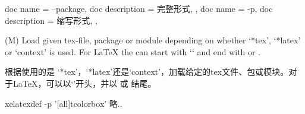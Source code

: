 \begin{docKeys}[
doc no index,   %
doc parameter = {~\meta{pkg}},
]
{
{
    doc name        = --package,
    doc description = 完整形式,
},
{
    doc name        = -p,
    doc description = 缩写形式,
},
}

(M) Load given tex-file, package or module depending on whether `*tex', `*latex'
or `context' is used. For LaTeX the  can start with `` and end
with  or .

根据使用的是 `*tex'，`*latex'还是`context'，加载给定的tex文件、包或模块。对于LaTeX，可以以`'开头，并以 或  结尾。


\begin{commandshell} 
xelatexdef -p '[all]{tcolorbox}' 略..
\end{commandshell}  
\end{docKeys}

